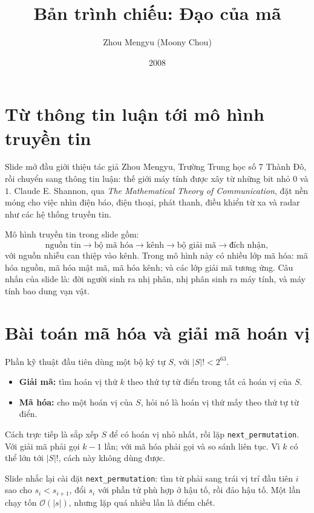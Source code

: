 \documentclass[11pt]{article}
\title{Bản trình chiếu: Đạo của mã}
\author{Zhou Mengyu (Moony Chou)}
\date{2008}
\newcommand{\Oh}{\mathcal{O}}
\begin{document}
\maketitle


\section{Từ thông tin luận tới mô hình truyền tin}

Slide mở đầu giới thiệu tác giả Zhou Mengyu, Trường Trung học số 7 Thành Đô,
rồi chuyển sang thông tin luận: thế giới máy tính được xây từ những bit nhỏ
\(0\) và \(1\). Claude E. Shannon, qua \textit{The Mathematical Theory of
Communication}, đặt nền móng cho việc nhìn điện báo, điện thoại, phát thanh,
điều khiển từ xa và radar như các hệ thống truyền tin.

Mô hình truyền tin trong slide gồm:
\[
\text{nguồn tin}\to \text{bộ mã hóa}\to \text{kênh}\to
\text{bộ giải mã}\to \text{đích nhận},
\]
với nguồn nhiễu can thiệp vào kênh. Trong mô hình này có nhiều lớp mã hóa:
mã hóa nguồn, mã hóa mật mã, mã hóa kênh; và các lớp giải mã tương ứng. Câu
nhấn của slide là: đời người sinh ra nhị phân, nhị phân sinh ra máy tính, và
máy tính bao dung vạn vật.

\section{Bài toán mã hóa và giải mã hoán vị}

Phần kỹ thuật đầu tiên dùng một bộ ký tự \(S\), với \(|S|!<2^{63}\).
\begin{itemize}
  \item \textbf{Giải mã:} tìm hoán vị thứ \(k\) theo thứ tự từ điển trong tất
  cả hoán vị của \(S\).
  \item \textbf{Mã hóa:} cho một hoán vị của \(S\), hỏi nó là hoán vị thứ mấy
  theo thứ tự từ điển.
\end{itemize}

Cách trực tiếp là sắp xếp \(S\) để có hoán vị nhỏ nhất, rồi lặp
\texttt{next\_permutation}. Với giải mã phải gọi \(k-1\) lần; với mã hóa phải
gọi và so sánh liên tục. Vì \(k\) có thể lớn tới \(|S|!\), cách này không dùng
được.

Slide nhắc lại cài đặt \texttt{next\_permutation}: tìm từ phải sang trái vị
trí đầu tiên \(i\) sao cho \(s_i<s_{i+1}\), đổi \(s_i\) với phần tử phù hợp ở
hậu tố, rồi đảo hậu tố. Một lần chạy tốn \(\Oh(|s|)\), nhưng lặp quá nhiều
lần là điểm chết.
\end{document}
